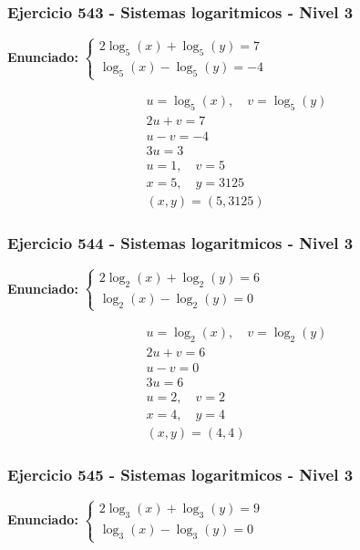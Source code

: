 \documentclass[12pt,a4paper]{article}
\begin{document}
\subsubsection*{Ejercicio 543 - Sistemas logaritmicos - Nivel 3}
\textbf{Enunciado:} \(\begin{cases} 2\log_{5}\left(x\right)+\log_{5}\left(y\right)=7\\ \log_{5}\left(x\right)-\log_{5}\left(y\right)=-4\end{cases}\)

\[
\begin{aligned}
u=\log_{5}\left(x\right),\quad v=\log_{5}\left(y\right)\\
2u+v=7\\
u-v=-4\\
3u=3\\
u=1,\quad v=5\\
x=5,\quad y=3125\\
\boxed{(x,y)=(5,3125)}
\end{aligned}
\]


\subsubsection*{Ejercicio 544 - Sistemas logaritmicos - Nivel 3}
\textbf{Enunciado:} \(\begin{cases} 2\log_{2}\left(x\right)+\log_{2}\left(y\right)=6\\ \log_{2}\left(x\right)-\log_{2}\left(y\right)=0\end{cases}\)

\[
\begin{aligned}
u=\log_{2}\left(x\right),\quad v=\log_{2}\left(y\right)\\
2u+v=6\\
u-v=0\\
3u=6\\
u=2,\quad v=2\\
x=4,\quad y=4\\
\boxed{(x,y)=(4,4)}
\end{aligned}
\]


\subsubsection*{Ejercicio 545 - Sistemas logaritmicos - Nivel 3}
\textbf{Enunciado:} \(\begin{cases} 2\log_{3}\left(x\right)+\log_{3}\left(y\right)=9\\ \log_{3}\left(x\right)-\log_{3}\left(y\right)=0\end{cases}\)
\end{document}
